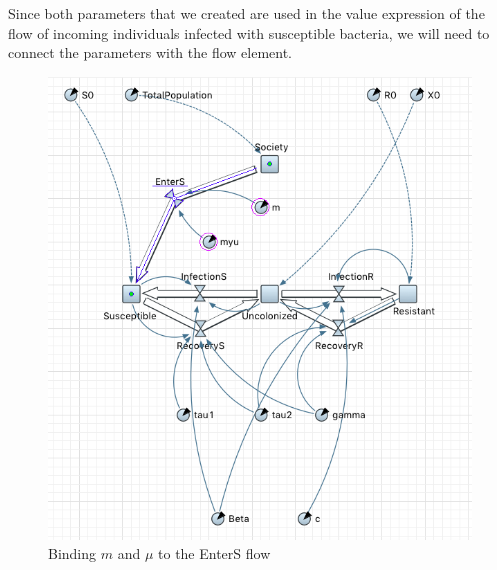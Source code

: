 Since both parameters that we created are used in the value expression of the flow of incoming individuals infected with susceptible bacteria, we will need to connect the parameters with the flow element.

\begin{figure}[H]
  \centering
  \includegraphics[height=0.5\textwidth]{img/screens/society/society8}
  \caption{Binding $m$ and $\mu$ to the EnterS flow}
\end{figure}

